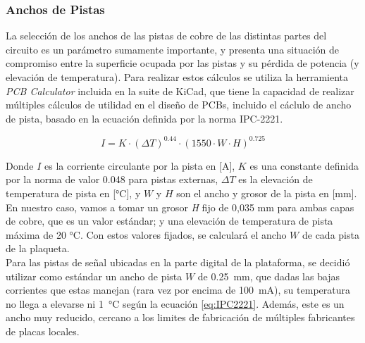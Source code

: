 \subsubsection{Anchos de Pistas}

La selección de los anchos de las pistas de cobre de las distintas partes del circuito es un parámetro sumamente importante, y presenta una situación de compromiso entre la superficie ocupada por las pistas y su pérdida de potencia (y elevación de temperatura). Para realizar estos cálculos se utiliza la herramienta \textit{PCB Calculator} incluida en la suite de KiCad, que tiene la capacidad de realizar múltiples cálculos de utilidad en el diseño de PCBs, incluido el cáclulo de ancho de pista, basado en la ecuación definida por la norma IPC-2221.

\begin{equation}\label{eq:IPC2221}
    I = K\cdot (\Delta T)^{\num{0.44}}\cdot (\num{1550}\cdot W\cdot H)^{\num{0.725}}
\end{equation}

Donde $I$ es la corriente circulante por la pista en [\unit{\ampere}], $K$ es una constante definida por la norma de valor \num{0.048} para pistas externas, $\Delta T$ es la elevación de temperatura de pista en [\unit{\celsius}], y $W$ y $H$ son el ancho y grosor de la pista en [\unit{\milli\metre}].\\

En nuestro caso, vamos a tomar un {\Medium grosor \textit{H} fijo de 0,035 mm} para ambas capas de cobre, que es un valor estándar; y una {\Medium elevación de temperatura de pista máxima de 20 °C}. Con estos valores fijados, se calculará el ancho $W$ de cada pista de la plaqueta.\\

Para las pistas de señal ubicadas en la parte digital de la plataforma, se decidió utilizar como estándar un ancho de pista $W$ de \SI[]{0.25}[]{\milli\metre}, que dadas las bajas corrientes que estas manejan (rara vez por encima de \SI[]{100}[]{\milli\ampere}), su temperatura no llega a elevarse ni \SI[]{1}[]{\celsius} según la ecuación \ref{eq:IPC2221}. Además, este es un ancho muy reducido, cercano a los limites de fabricación de múltiples fabricantes de placas locales.\\